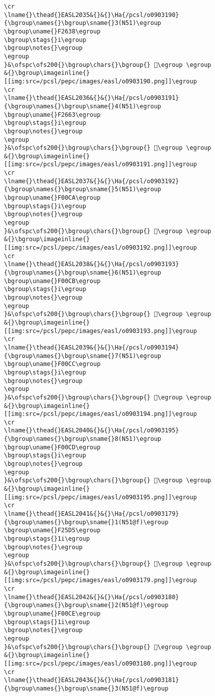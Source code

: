 \begin{verbatim}
\cr
\lname{}\thead{}EASL2035&{}&{}\Ha{/pcsl/o0903190}{\bgroup\names{}\bgroup\sname{}3(N51)\egroup
\bgroup\uname{}F2638\egroup
\bgroup\stags{}i\egroup
\bgroup\notes{}\egroup
\egroup
}&\ofspc\ofs200{}\bgroup\chars{}\bgroup{} 󲘸\egroup \egroup
&{}\bgroup\imageinline{}[[img:src=/pcsl/pepc/images/easl/o0903190.png]]\egroup
\cr
\lname{}\thead{}EASL2036&{}&{}\Ha{/pcsl/o0903191}{\bgroup\names{}\bgroup\sname{}4(N51)\egroup
\bgroup\uname{}F2663\egroup
\bgroup\stags{}i\egroup
\bgroup\notes{}\egroup
\egroup
}&\ofspc\ofs200{}\bgroup\chars{}\bgroup{} 󲙣\egroup \egroup
&{}\bgroup\imageinline{}[[img:src=/pcsl/pepc/images/easl/o0903191.png]]\egroup
\cr
\lname{}\thead{}EASL2037&{}&{}\Ha{/pcsl/o0903192}{\bgroup\names{}\bgroup\sname{}5(N51)\egroup
\bgroup\uname{}F00CA\egroup
\bgroup\stags{}i\egroup
\bgroup\notes{}\egroup
\egroup
}&\ofspc\ofs200{}\bgroup\chars{}\bgroup{} 󰃊\egroup \egroup
&{}\bgroup\imageinline{}[[img:src=/pcsl/pepc/images/easl/o0903192.png]]\egroup
\cr
\lname{}\thead{}EASL2038&{}&{}\Ha{/pcsl/o0903193}{\bgroup\names{}\bgroup\sname{}6(N51)\egroup
\bgroup\uname{}F00CB\egroup
\bgroup\stags{}i\egroup
\bgroup\notes{}\egroup
\egroup
}&\ofspc\ofs200{}\bgroup\chars{}\bgroup{} 󰃋\egroup \egroup
&{}\bgroup\imageinline{}[[img:src=/pcsl/pepc/images/easl/o0903193.png]]\egroup
\cr
\lname{}\thead{}EASL2039&{}&{}\Ha{/pcsl/o0903194}{\bgroup\names{}\bgroup\sname{}7(N51)\egroup
\bgroup\uname{}F00CC\egroup
\bgroup\stags{}i\egroup
\bgroup\notes{}\egroup
\egroup
}&\ofspc\ofs200{}\bgroup\chars{}\bgroup{} 󰃌\egroup \egroup
&{}\bgroup\imageinline{}[[img:src=/pcsl/pepc/images/easl/o0903194.png]]\egroup
\cr
\lname{}\thead{}EASL2040&{}&{}\Ha{/pcsl/o0903195}{\bgroup\names{}\bgroup\sname{}8(N51)\egroup
\bgroup\uname{}F00CD\egroup
\bgroup\stags{}i\egroup
\bgroup\notes{}\egroup
\egroup
}&\ofspc\ofs200{}\bgroup\chars{}\bgroup{} 󰃍\egroup \egroup
&{}\bgroup\imageinline{}[[img:src=/pcsl/pepc/images/easl/o0903195.png]]\egroup
\cr
\lname{}\thead{}EASL2041&{}&{}\Ha{/pcsl/o0903179}{\bgroup\names{}\bgroup\sname{}1(N51@f)\egroup
\bgroup\uname{}F25D5\egroup
\bgroup\stags{}1i\egroup
\bgroup\notes{}\egroup
\egroup
}&\ofspc\ofs200{}\bgroup\chars{}\bgroup{} 󲗕\egroup \egroup
&{}\bgroup\imageinline{}[[img:src=/pcsl/pepc/images/easl/o0903179.png]]\egroup
\cr
\lname{}\thead{}EASL2042&{}&{}\Ha{/pcsl/o0903180}{\bgroup\names{}\bgroup\sname{}2(N51@f)\egroup
\bgroup\uname{}F00CE\egroup
\bgroup\stags{}1i\egroup
\bgroup\notes{}\egroup
\egroup
}&\ofspc\ofs200{}\bgroup\chars{}\bgroup{} 󰃎\egroup \egroup
&{}\bgroup\imageinline{}[[img:src=/pcsl/pepc/images/easl/o0903180.png]]\egroup
\cr
\lname{}\thead{}EASL2043&{}&{}\Ha{/pcsl/o0903181}{\bgroup\names{}\bgroup\sname{}3(N51@f)\egroup

\end{verbatim}
